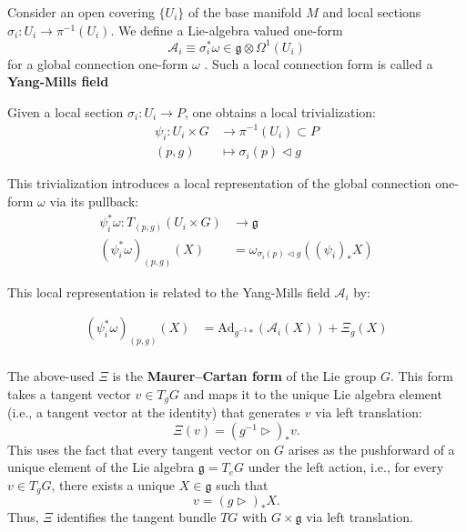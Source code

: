 Consider an open covering \( \{U_i\} \) of the base manifold \( M \) and local sections \( \sigma_i : U_i \rightarrow \pi^{-1}(U_i) \). We define a Lie-algebra valued one-form \[ \mathcal{A}_i \equiv \sigma_i^* \omega \in \mathfrak{g} \otimes\Omega^1(U_i) \] for a global connection one-form \( \omega \) \cite{NakaharaGeometrytopologyphysics2005}. Such a local connection form is called a \textbf{Yang-Mills field} \cite{FredericSchullerLocalrepresentationsconnectionbasemanifoldYangMillsfieldsLec222015}

Given a local section \( \sigma_i : U_i \to P \), one obtains a local trivialization:
\begin{align*}
  \psi_i : U_i \times G &\longrightarrow \pi^{-1}(U_i) \subset P \\
  (p, g) &\mapsto \sigma_i(p) \triangleleft g
\end{align*}


This trivialization introduces a local representation of the global connection one-form \( \omega \) via its pullback:
\begin{align*}
  \psi_i^* \omega : T_{(p, g)}(U_i \times G) &\longrightarrow \mathfrak{g} \\
  (\psi_i^* \omega)_{(p, g)}(X) &= \omega_{\sigma_i(p) \triangleleft g}\left((\psi_i)_* X\right)
\end{align*}


This local representation is related to the Yang-Mills field \( \mathcal{A}_i \) by\cite{FredericSchullerLocalrepresentationsconnectionbasemanifoldYangMillsfieldsLec222015}:

\begin{align*}
  (\psi_i^* \omega)_{(p, g)}(X) &= \text{Ad}_{g^{-1}*} \left(\mathcal{A}_i (X)\right) + \Xi_g(X) \\
\end{align*}

The above-used $\Xi$ is the \textbf{Maurer–Cartan form} of the Lie group \( G \). This form takes a tangent vector \( v \in T_gG \) and maps it to the unique Lie algebra element (i.e., a tangent vector at the identity) that generates \( v \) via left translation:
\[
\Xi(v) = (g^{-1} \triangleright)_* v.
\]
This uses the fact that every tangent vector on \( G \) arises as the pushforward of a unique element of the Lie algebra \( \mathfrak{g} = T_eG \) under the left action, i.e., for every \( v \in T_gG \), there exists a unique \( X \in \mathfrak{g} \) such that
\[
v = (g \triangleright)_* X.
\]
Thus, \( \Xi \) identifies the tangent bundle \( TG \) with \( G \times \mathfrak{g} \) via left translation\cite{MaurerCartanform2025}.

